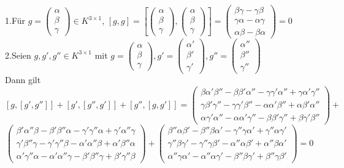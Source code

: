 \documentclass[12pt,leqno,twoside]{book}
\begin{document}
1.F\"{u}r $g=\left(\begin{array}{c} \alpha \\ \beta \\ \gamma \end{array}\right)\in K^{3\times1}$, $[g,g]=\left[\left(\begin{array}{c} \alpha \\ \beta \\ \gamma \end{array}\right),\left(\begin{array}{c} \alpha \\ \beta \\ \gamma \end{array}\right)\right]=\left(\begin{array}{c} \beta\gamma-\gamma\beta \\ \gamma\alpha-\alpha\gamma \\ \alpha\beta-\beta\alpha \end{array}\right)=0$\\
2.Seien $g,g',g''\in K^{3\times1}$ mit $g=\left(\begin{array}{c} \alpha \\ \beta \\ \gamma \end{array}\right),g'=\left(\begin{array}{c} \alpha' \\ \beta' \\ \gamma' \end{array}\right),g''=\left(\begin{array}{c} \alpha'' \\ \beta'' \\ \gamma'' \end{array}\right)$\\
Dann gilt 
\[[g,[g',g'']]+[g',[g'',g']]+[g'',[g,g']]=\left(\begin{array}{c} \beta\alpha'\beta''-\beta\beta'\alpha''-\gamma\gamma'\alpha''+\gamma\alpha'\gamma'' \\ \gamma\beta'\gamma''-\gamma\gamma'\beta''-\alpha\alpha'\beta''+\alpha\beta'\alpha'' \\ \alpha\gamma'\alpha''-\alpha\alpha'\gamma''-\beta\beta'\gamma''+\beta\gamma'\beta'' \end{array}\right)+\]\[\left(\begin{array}{c} \beta'\alpha''\beta-\beta'\beta''\alpha-\gamma'\gamma''\alpha+\gamma'\alpha''\gamma \\ \gamma'\beta''\gamma-\gamma'\gamma''\beta-\alpha'\alpha''\beta+\alpha'\beta''\alpha \\ \alpha'\gamma''\alpha-\alpha'\alpha''\gamma-\beta'\beta''\gamma+\beta'\gamma''\beta \end{array}\right)+\left(\begin{array}{c} \beta''\alpha\beta'-\beta''\beta\alpha'-\gamma''\gamma\alpha'+\gamma''\alpha\gamma' \\ \gamma''\beta\gamma'-\gamma''\gamma\beta'-\alpha''\alpha\beta'+\alpha''\beta\alpha' \\ \alpha''\gamma\alpha'-\alpha''\alpha\gamma'-\beta''\beta\gamma'+\beta''\gamma\beta' \end{array}\right)=0\]
\end{document}
